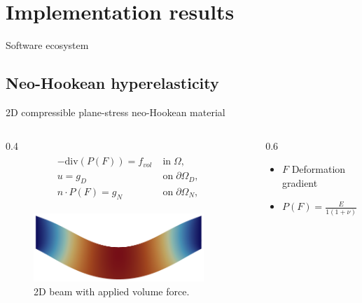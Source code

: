 \section{Implementation results}

\begin{frame}{Software ecosystem}
    
\end{frame}
\subsection{Neo-Hookean hyperelasticity}

\begin{frame}{2D compressible plane-stress neo-Hookean material}
	\vspace{0mm}
	\begin{columns}
		\begin{column}{0.4\textwidth}%
			\begin{align*}
				\label{eq:nonlinelas}
				\begin{split}
					-\mathrm{div}(P(F)) = f_{vol}\; & \mathrm{in}\;\Omega,           \\
					u = g_D \;                      & \mathrm{on}\;\partial\Omega_D, \\
					n\cdot P(F) = g_N\;             & \mathrm{on}\;\partial\Omega_N,
				\end{split}
			\end{align*}
			\begin{figure}
				\centering
				\includegraphics[width=0.9\textwidth]{images/beam2D.png}
				\caption{2D beam with applied volume force.}
				\label{fig:beam2d}
			\end{figure}
		\end{column}%
		\begin{column}{0.6\textwidth}
			\vspace{-1em}
			\centering
			\begin{itemize}
				\item $F$ Deformation gradient
				\item $P(F) = \frac{E}{1(1+\nu)}(F-F^{-T}) + \frac{E\nu}{(1+\nu)(1-2\nu)}\mathrm{ln}(\mathrm{det}(F)F^{-T})$

\end{itemize}
\end{column}
\end{columns}
\end{frame}
